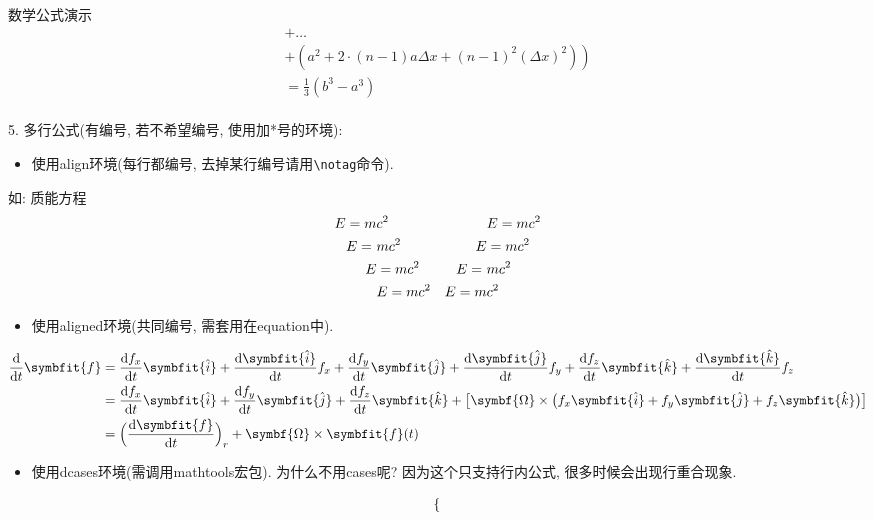 \documentclass[hyperref,UTF8,11pt,CJK]{beamer}
\begin{document}
\begin{frame}{数学公式演示}
\begin{multline}
			+\ldots\\
			\left.+\left(a^{2}+2\cdot(n-1)a\Delta x+(n-1)^{2}\left(\Delta x\right)^{2}\right)\right)\\
			=\frac{1}{3}\left(b^{3}-a^{3}\right)
		\end{multline}\\[1ex]
	\pagebreak
	{\color{JXred}5. 多行公式(有编号, 若不希望编号, 使用加*号的环境):}
	\begin{itemize}
		\item 使用align环境(每行都编号, 去掉某行编号请用\verb|\notag|命令).
	\end{itemize}
	如: 质能方程
		\begin{align}
			E=m&c^2 & &E=mc^2\\
			E=~&mc^2 & E&=mc^2 \notag \\
			E&=mc^2 & E=~&mc^2\\
			&E=mc^2 & E=m&c^2
		\end{align}
	\begin{itemize}
		\item 使用aligned环境(共同编号, 需套用在equation中).
	\end{itemize}
		\begin{equation}
			\begin{aligned}
			\dfrac{\mathrm{d}}{\mathrm{d}t} \symbfit{f} &= \dfrac{\mathrm{d}f_x}{\mathrm{d}t} \symbfit{\hat{i}} + \dfrac{\mathrm{d}\symbfit{\hat{i}}}{\mathrm{d}t} f_x + \dfrac{\mathrm{d}f_y}{\mathrm{d}t} \symbfit{\hat{j}} + \dfrac{\mathrm{d}\symbfit{\hat{j}}}{\mathrm{d}t} f_y + \dfrac{\mathrm{d}f_z}{\mathrm{d}t} \symbfit{\hat{k}} + \dfrac{\mathrm{d}\symbfit{\hat{k}}}{\mathrm{d}t} f_z \\
			&= \dfrac{\mathrm{d}f_x}{\mathrm{d}t} \symbfit{\hat{i}} + \dfrac{\mathrm{d}f_y}{\mathrm{d}t} \symbfit{\hat{j}} + \dfrac{\mathrm{d}f_z}{\mathrm{d}t} \symbfit{\hat{k}} + \big[\symbf{\Omega} \times \big( f_x \symbfit{\hat{i}} + f_y \symbfit{\hat{j}} + f_z \symbfit{\hat{k}}\big) \big] \\
			&= \Big(\dfrac{\mathrm{d}\symbfit{f}}{\mathrm{d}t}\Big)_r + \symbf{\Omega} \times \symbfit{f}(t)
			\end{aligned}
		\end{equation}
	\begin{itemize}
		\item 使用dcases环境(需调用mathtools宏包). 为什么不用cases呢? 因为这个只支持行内公式, 很多时候会出现行重合现象.
	\end{itemize}
		\begin{equation}
			\begin{dcases}

\end{dcases}
\end{equation}
\end{frame}
\end{document}
